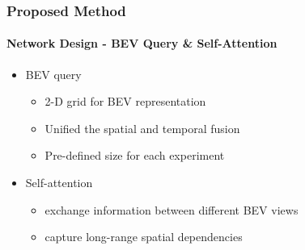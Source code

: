 \documentclass[
	12pt, %
	aspectratio=169, %
]{beamer}
\begin{document}
\begin{frame}
	\frametitle{Proposed Method}
	\framesubtitle{Network Design - BEV Query \& Self-Attention}

	\begin{itemize}
		\item BEV query
		\begin{itemize}
			\item 2-D grid for BEV representation
			\item Unified the spatial and temporal fusion
			\item Pre-defined size for each experiment
		\end{itemize}

		\item Self-attention
		\begin{itemize}
			\item exchange information between different BEV views
			\item capture long-range spatial dependencies
		\end{itemize}
	\end{itemize}
\end{frame}
\end{document}

